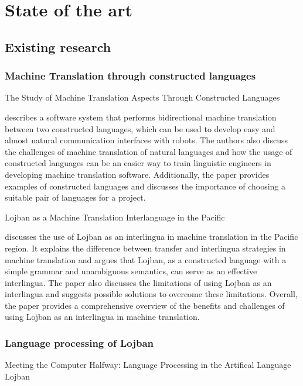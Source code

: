 \chapter{State of the art}

\vspace{0.5cm}

\section{Existing research}

\subsection{Machine Translation through constructed languages}

The Study of Machine Translation Aspects Through Constructed Languages

describes a software system that performs bidirectional machine translation between two constructed languages, which can be used to develop easy and almost natural communication interfaces with robots. The authors also discuss the challenges of machine translation of natural languages and how the usage of constructed languages can be an easier way to train linguistic engineers in developing machine translation software. Additionally, the paper provides examples of constructed languages and discusses the importance of choosing a suitable pair of languages for a project.

Lojban as a Machine Translation Interlanguage in the Pacific

discusses the use of Lojban as an interlingua in machine translation in the Pacific region. It explains the difference between transfer and interlingua strategies in machine translation and argues that Lojban, as a constructed language with a simple grammar and unambiguous semantics, can serve as an effective interlingua. The paper also discusses the limitations of using Lojban as an interlingua and suggests possible solutions to overcome these limitations. Overall, the paper provides a comprehensive overview of the benefits and challenges of using Lojban as an interlingua in machine translation.

\subsection{Language processing of Lojban}

Meeting the Computer Halfway: Language Processing in the Artifical Language Lojban

